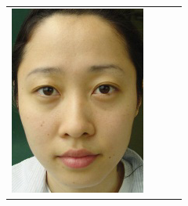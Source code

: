\begin{longtable}{|N||c|c|c|}
\begin{minipage}{.29\textwidth}
    \includegraphics[width=\textwidth,height=\textheight,keepaspectratio]{images/seo_target1}
  \end{minipage} & 
  \begin{minipage}{.29\textwidth}

\end{minipage}
\end{longtable}
